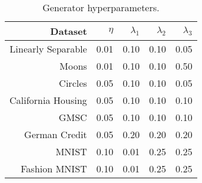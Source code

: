 \begin{table}

\caption{Generator hyperparameters. \label{tab:genparams} \newline}
\centering
\fontsize{8}{10}\selectfont
\begin{tabular}[t]{rrrrr}
\toprule
Dataset & $\eta$ & $\lambda_1$ & $\lambda_2$ & $\lambda_3$\\
\midrule
Linearly Separable & 0.01 & 0.10 & 0.10 & 0.05\\
Moons & 0.01 & 0.10 & 0.10 & 0.50\\
Circles & 0.05 & 0.10 & 0.10 & 0.05\\
California Housing & 0.05 & 0.10 & 0.10 & 0.10\\
GMSC & 0.05 & 0.10 & 0.10 & 0.10\\
German Credit & 0.05 & 0.20 & 0.20 & 0.20\\
MNIST & 0.10 & 0.01 & 0.25 & 0.25\\
Fashion MNIST & 0.10 & 0.01 & 0.25 & 0.25\\
\bottomrule
\end{tabular}
\end{table}
